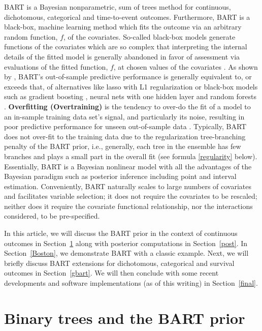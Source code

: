\documentclass[cmbright,doublespace]{WileySTAT-V1}
\theoremstyle{plain}
\begin{document}
BART is a Bayesian nonparametric, sum of trees method for continuous,
dichotomous, categorical and time-to-event outcomes.  Furthermore,
BART is a black-box, machine learning method which fits the outcome
via an arbitrary random function, $f$, of the covariates.  So-called
black-box models generate functions of the covariates which are so
complex that interpreting the internal details of the fitted model is
generally abandoned in favor of assessment via evaluations of the
fitted function, $f$, at chosen values of the covariates
\citep{Frie01}.  As shown by \citet{ChipGeor10}, BART's out-of-sample
predictive performance is generally equivalent to, or exceeds that, of
alternatives like lasso with L1 regularization \citep{EfroHast04} or
black-box models such as gradient boosting \citep{FreuScha97,Frie01},
neural nets with one hidden layer \citep{Ripl07,VenaRipl13} and random
forests \citep{Brei01}.  \textbf{Overfitting (Overtraining)} is the
tendency to over-do the fit of a model to an in-sample training data
set's signal, and particularly its noise, resulting in poor predictive
performance for unseen out-of-sample data \citep{Cris14,CookRans16}.
Typically, BART does not over-fit to the training data due to the
regularization tree-branching penalty of the BART prior, i.e.,
generally, each tree in the ensemble has few branches and plays a
small part in the overall fit (see formula \eqref{regularity}
below). Essentially, BART is a Bayesian nonlinear model with all the
advantages of the Bayesian paradigm such as posterior inference
including point and interval estimation.  Conveniently, BART naturally
scales to large numbers of covariates and facilitates variable
selection; it does not require the covariates to be rescaled; neither
does it require the covariate functional relationship, nor the
interactions considered, to be pre-specified.

In this article, we will discuss the BART prior in the context of
continuous outcomes in Section~\ref{prior} along with posterior
computations in Section~\ref{post}.  In Section~\ref{Boston}, we
demonstrate BART with a classic example.  Next, we will briefly
discuss BART extensions for dichotomous, categorical and survival
outcomes in Section~\ref{gbart}.  We will then conclude with some
recent developments and software implementations (as of this writing)
in Section~\ref{final}.

\section{Binary trees and the BART prior}\label{prior}
\end{document}
